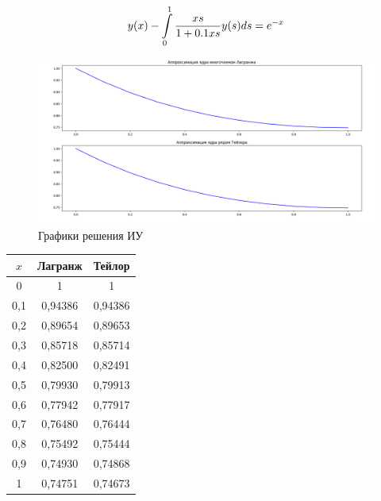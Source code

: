 \documentclass[14pt, a4paper]{extarticle}
\begin{document}
	\[ y(x) - \int\displaylimits_{0}^{1} \dfrac{xs}{1+0.1xs} y(s)ds = e^{-x} \]
	\begin{figure}[h]
		\centering
		\includegraphics[width = \linewidth]{plot_3.png}
		\caption{Графики решения ИУ}
	\end{figure}
	\begin{center}
		\begin{tabular}{ |c|c|c| }
			\hline
			$x$ & Лагранж & Тейлор\\
			\hline
			0 & 1 & 1\\
			\hline
			0,1 & 0,94386 & 0,94386\\
			\hline
			0,2 & 0,89654 & 0,89653\\
			\hline
			0,3 & 0,85718 & 0,85714\\
			\hline
			0,4 & 0,82500 & 0,82491\\
			\hline
			0,5 & 0,79930 & 0,79913\\
			\hline
			0,6 & 0,77942 & 0,77917\\
			\hline
			0,7 & 0,76480 & 0,76444\\
			\hline
			0,8 & 0,75492 & 0,75444\\
			\hline
			0,9 & 0,74930 & 0,74868\\
			\hline
			1 & 0,74751 & 0,74673\\
			\hline
		\end{tabular}
	\end{center}
	
\end{document}
